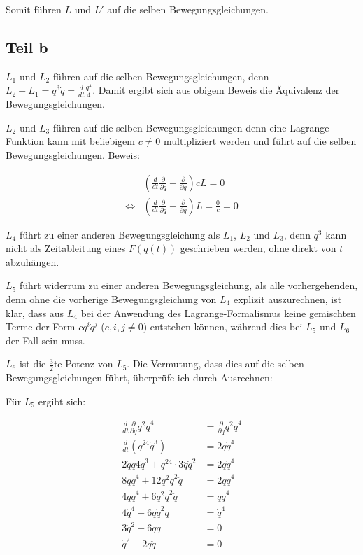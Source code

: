\documentclass[a4paper,german,12pt,smallheadings]{scrartcl}
\begin{document}
Somit führen $L$ und $L'$ auf die selben Bewegungsgleichungen.

\subsection*{Teil b}
$L_1$ und $L_2$ führen auf die selben Bewegungsgleichungen, denn $L_2 - L_1 =
q^3\dot{q} = \frac{d}{dt} \frac{q^4}{4}$. Damit ergibt sich aus obigem Beweis
die Äquivalenz der Bewegungsgleichungen.

$L_2$ und $L_3$ führen auf die selben Bewegungsgleichungen denn eine
Lagrange-Funktion kann mit beliebigem $c \neq 0$ multipliziert werden und führt
auf die selben Bewegungsgleichungen. Beweis:

\begin{align*}
  &\left(\frac{d}{dt} \frac{\partial}{\partial \dot{q}} - \frac{\partial}{\partial q}\right) c L = 0 \\
  \Leftrightarrow & \left(\frac{d}{dt} \frac{\partial}{\partial \dot{q}} - \frac{\partial}{\partial q}\right) L = \frac{0}{c} = 0
\end{align*}

$L_4$ führt zu einer anderen Bewegungsgleichung als $L_1$, $L_2$ und $L_3$,
denn $q^3$ kann nicht als Zeitableitung eines $F(q(t))$ geschrieben werden,
ohne direkt von $t$ abzuhängen.

$L_5$ führt widerrum zu einer anderen Bewegungsgleichung, als alle
vorhergehenden, denn ohne die vorherige Bewegungsgleichung von $L_4$ explizit
auszurechnen, ist klar, dass aus $L_4$ bei der Anwendung des
Lagrange-Formalismus keine gemischten Terme der Form $cq^i\dot{q}^j$
($c{,}i{,}j \neq 0$) entstehen können, während dies bei $L_5$ und $L_6$ der
Fall sein muss.

$L_6$ ist die $\frac{3}{2}$te Potenz von $L_5$. Die Vermutung, dass dies auf
die selben Bewegungsgleichungen führt, überprüfe ich durch Ausrechnen:

Für $L_5$ ergibt sich:

\begin{align*}
  \frac{d}{dt} \frac{\partial}{\partial \dot{q}} q^2\dot{q}^4 &= \frac{\partial}{\partial q} q^2\dot{q}^4 \\
  \frac{d}{dt} (q^24\dot{q}^3) &= 2q\dot{q}^4 \\
  2\dot{q}q4\dot{q}^3 + q^24 \cdot 3 \ddot{q}\dot{q}^2 &= 2q\dot{q}^4 \\
  8q\dot{q}^4+ 12q^2\dot{q}^2\ddot{q} &= 2q\dot{q}^4 \\
  4q\dot{q}^4+ 6q^2\dot{q}^2\ddot{q} &= q\dot{q}^4 \\
  4\dot{q}^4+ 6q\dot{q}^2\ddot{q} &= \dot{q}^4 \\
  3\dot{q}^2+ 6q\ddot{q} &= 0 \\
  \dot{q}^2+ 2q\ddot{q} &= 0 \\
\end{align*}
\end{document}
